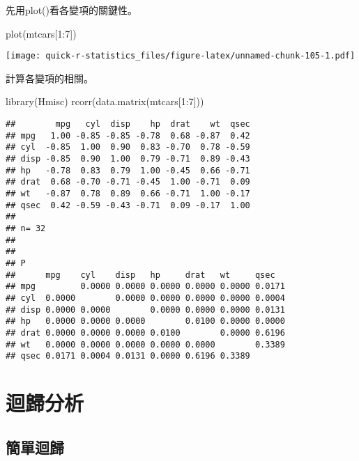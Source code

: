 \documentclass[
]{book}
\newenvironment{Shaded}{\begin{snugshade}}{\end{snugshade}}
\newcommand{\DecValTok}[1]{\textcolor[rgb]{0.00,0.00,0.81}{#1}}
\newcommand{\FunctionTok}[1]{\textcolor[rgb]{0.00,0.00,0.00}{#1}}
\newcommand{\NormalTok}[1]{#1}
\newcommand{\SpecialCharTok}[1]{\textcolor[rgb]{0.00,0.00,0.00}{#1}}
\begin{document}
先用plot()看各變項的關鍵性。

\begin{Shaded}
\begin{Highlighting}[]
\FunctionTok{plot}\NormalTok{(mtcars[}\DecValTok{1}\SpecialCharTok{:}\DecValTok{7}\NormalTok{])}
\end{Highlighting}
\end{Shaded}

\texttt{[image: quick-r-statistics\_files/figure-latex/unnamed-chunk-105-1.pdf]}

計算各變項的相關。

\begin{Shaded}
\begin{Highlighting}[]
\FunctionTok{library}\NormalTok{(Hmisc)}
\FunctionTok{rcorr}\NormalTok{(}\FunctionTok{data.matrix}\NormalTok{(mtcars[}\DecValTok{1}\SpecialCharTok{:}\DecValTok{7}\NormalTok{]))}
\end{Highlighting}
\end{Shaded}

\begin{verbatim}
##        mpg   cyl  disp    hp  drat    wt  qsec
## mpg   1.00 -0.85 -0.85 -0.78  0.68 -0.87  0.42
## cyl  -0.85  1.00  0.90  0.83 -0.70  0.78 -0.59
## disp -0.85  0.90  1.00  0.79 -0.71  0.89 -0.43
## hp   -0.78  0.83  0.79  1.00 -0.45  0.66 -0.71
## drat  0.68 -0.70 -0.71 -0.45  1.00 -0.71  0.09
## wt   -0.87  0.78  0.89  0.66 -0.71  1.00 -0.17
## qsec  0.42 -0.59 -0.43 -0.71  0.09 -0.17  1.00
## 
## n= 32 
## 
## 
## P
##      mpg    cyl    disp   hp     drat   wt     qsec  
## mpg         0.0000 0.0000 0.0000 0.0000 0.0000 0.0171
## cyl  0.0000        0.0000 0.0000 0.0000 0.0000 0.0004
## disp 0.0000 0.0000        0.0000 0.0000 0.0000 0.0131
## hp   0.0000 0.0000 0.0000        0.0100 0.0000 0.0000
## drat 0.0000 0.0000 0.0000 0.0100        0.0000 0.6196
## wt   0.0000 0.0000 0.0000 0.0000 0.0000        0.3389
## qsec 0.0171 0.0004 0.0131 0.0000 0.6196 0.3389
\end{verbatim}

\hypertarget{ux8ff4ux6b78ux5206ux6790}{%
\section{迴歸分析}\label{ux8ff4ux6b78ux5206ux6790}}

\hypertarget{ux7c21ux55aeux8ff4ux6b78}{%
\subsection{簡單迴歸}\label{ux7c21ux55aeux8ff4ux6b78}}
\end{document}
